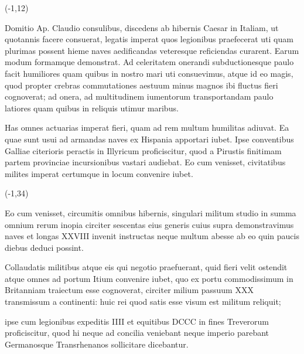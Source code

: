 \documentclass[a0,landscape]{a0poster}
\def\Head#1{\begin{center}\noindent{\LARGE\bf\color{MilaBlue}#1}\end{center}\bigskip}
\begin{document}

\begin{textblock}{0}(-1,12)

\begin{minipage}{35cm}
\Head{Motivation}

 Domitio Ap. Claudio consulibus, discedens ab hibernis Caesar in Italiam, ut quotannis facere consuerat, legatis imperat quos legionibus praefecerat uti quam plurimas possent hieme naves aedificandas veteresque reficiendas curarent. Earum modum formamque demonstrat. Ad celeritatem onerandi subductionesque paulo facit humiliores quam quibus in nostro mari uti consuevimus, atque id eo magis, quod propter crebras commutationes aestuum minus magnos ibi fluctus fieri cognoverat; ad onera, ad multitudinem iumentorum transportandam paulo latiores quam quibus in reliquis utimur maribus.

 Has omnes actuarias imperat fieri, quam ad rem multum humilitas adiuvat. Ea quae sunt usui ad armandas naves ex Hispania apportari iubet. Ipse conventibus Galliae citerioris peractis in Illyricum proficiscitur, quod a Pirustis finitimam partem provinciae incursionibus vastari audiebat. Eo cum venisset, civitatibus milites imperat certumque in locum convenire iubet.

\end{minipage}
\end{textblock}


\begin{textblock}{0}(-1,34)
\begin{minipage}{35cm}
\Head{Importance Sampling}

Eo cum venisset, circumitis omnibus hibernis, singulari militum studio in summa omnium rerum inopia circiter sescentas eius generis cuius supra demonstravimus naves et longas XXVIII invenit instructas neque multum abesse ab eo quin paucis diebus deduci possint.

Collaudatis militibus atque eis qui negotio praefuerant, quid fieri velit ostendit atque omnes ad portum Itium convenire iubet, quo ex portu commodissimum in Britanniam traiectum esse cognoverat, circiter milium passuum XXX transmissum a continenti: huic rei quod satis esse visum est militum reliquit;

ipse cum legionibus expeditis IIII et equitibus DCCC in fines Treverorum proficiscitur, quod hi neque ad concilia veniebant neque imperio parebant Germanosque Transrhenanos sollicitare dicebantur.

\end{minipage}
\end{textblock}
\end{document}
